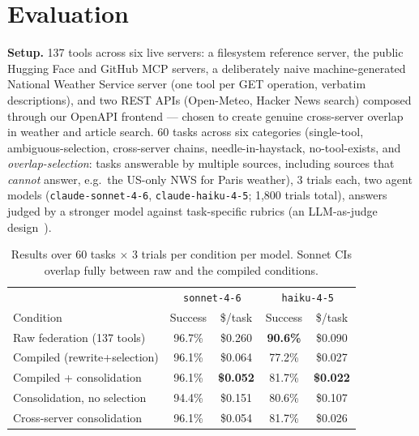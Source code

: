 \documentclass[11pt]{article}
\begin{document}
\section{Evaluation}\label{sec:eval}

\textbf{Setup.} 137 tools across six live servers: a filesystem reference
server, the public Hugging Face and GitHub MCP servers, a deliberately naive
machine-generated National Weather Service server (one tool per GET
operation, verbatim descriptions), and two REST APIs (Open-Meteo,
Hacker News search) composed through our OpenAPI frontend --- chosen to
create genuine cross-server overlap in weather and article search. 60 tasks
across six categories (single-tool, ambiguous-selection, cross-server
chains, needle-in-haystack, no-tool-exists, and \emph{overlap-selection}:
tasks answerable by multiple sources, including sources that \emph{cannot}
answer, e.g.\ the US-only NWS for Paris weather), 3 trials each, two agent
models (\texttt{claude-sonnet-4-6}, \texttt{claude-haiku-4-5}; 1{,}800
trials total), answers judged by a stronger model against task-specific
rubrics (an LLM-as-judge design~\cite{zheng2023judge}).

\begin{table}[h]
\centering
\begin{tabular}{lcccc}
\toprule
& \multicolumn{2}{c}{\texttt{sonnet-4-6}} & \multicolumn{2}{c}{\texttt{haiku-4-5}} \\
Condition & Success & \$/task & Success & \$/task \\
\midrule
Raw federation (137 tools) & 96.7\% & \$0.260 & \textbf{90.6\%} & \$0.090 \\
Compiled (rewrite+selection) & 96.1\% & \$0.064 & 77.2\% & \$0.027 \\
Compiled + consolidation & 96.1\% & \textbf{\$0.052} & 81.7\% & \textbf{\$0.022} \\
Consolidation, no selection & 94.4\% & \$0.151 & 80.6\% & \$0.107 \\
Cross-server consolidation & 96.1\% & \$0.054 & 81.7\% & \$0.026 \\
\bottomrule
\end{tabular}
\caption{Results over 60 tasks $\times$ 3 trials per condition per model.
Sonnet CIs overlap fully between raw and the compiled conditions.}
\end{table}
\end{document}
